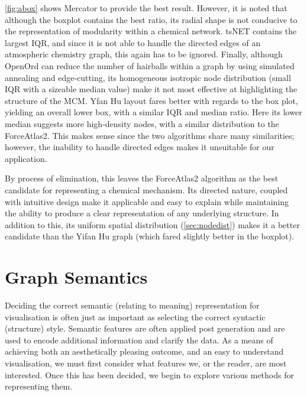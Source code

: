 \autoref{fig:abox} shows Mercator to provide the best result. However, it is noted that although the boxplot contains the best ratio, its radial shape is not conducive to the representation of modularity within a chemical network. tsNET contains the largest IQR, and since it is not able to handle the directed edges of an atmospheric chemistry graph, this again has to be ignored. Finally, although OpenOrd can reduce the number of hairballs within a graph by using simulated annealing and edge-cutting, its homogeneous isotropic node distribution (small IQR with a sizeable median value) make it not most effective at highlighting the structure of the MCM.  Yfan Hu layout fares better with regards to the box plot, yielding an overall lower box, with a similar IQR and median ratio. Here its lower median suggests more high-density nodes, with a similar distribution to the ForceAtlas2. This makes sense since the two algorithms share many similarities; however, the inability to handle directed edges makes it unsuitable for our application. 

By process of elimination, this leaves the ForceAtlas2 algorithm as the best candidate for representing a chemical mechanism. Its directed nature, coupled with intuitive design make it applicable and easy to explain while maintaining the ability to produce a clear representation of any underlying structure. In addition to this, its uniform spatial distribution (\autoref{sec:nodedist}) makes it a better candidate than the Yifan Hu graph (which fared slightly better in the boxplot). 









\section{Graph Semantics}\label{semantic}

Deciding the correct semantic (relating to meaning) representation for visualisation is often just as important as selecting the correct syntactic (structure) style. Semantic features are often applied post generation \citep{aestheticsgraphvis} and are used to encode additional information and clarify the data. As a means of achieving both an aesthetically pleasing outcome, and an easy to understand visualisation, we must first consider what features we, or the reader, are most interested. Once this has been decided, we begin to explore various methods for representing them. 

